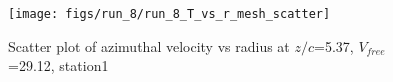 \begin{figure}[H]
\centering
\texttt{[image: figs/run\_8/run\_8\_T\_vs\_r\_mesh\_scatter]}
\caption{Scatter plot of azimuthal velocity vs radius at $z/c$=5.37, $V_{free}$=29.12, station1}
\label{fig:run_8_T_vs_r_mesh_scatter}
\end{figure}


